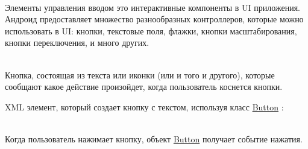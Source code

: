\newcommand{\View}{
  \href{https://developer.android.com/reference/android/view/View.html}{View}
}

\newcommand{\Button}{
  \href{https://developer.android.com/reference/android/widget/Button.html}{Button}
}

\newcommand{\Activity}{
  \href{https://developer.android.com/reference/android/app/Activity.html}{Activity}
}

\newcommand{\OnClickListener}{
  \href{https://developer.android.com/reference/android/view/View.OnClickListener.html}{View.OnClickListener}
}

\newcommand{\EditText}{
  \href{https://developer.android.com/reference/android/widget/EditText.html}{EditText}
}

\newcommand{\OnEditorActionListener}{
  \href{https://developer.android.com/reference/android/widget/TextView.OnEditorActionListener.html}{TextView.OnEditorActionListener}
}

\newcommand{\Checkbox}{
  \href{https://developer.android.com/reference/android/widget/CheckBox.html}{Checkbox}
}

\newcommand{\RadioButton}{
  \href{https://developer.android.com/reference/android/widget/RadioButton.html}{RadioButton}
}

\newcommand{\ToggleButton}{
  \href{https://developer.android.com/guide/topics/ui/controls/togglebutton.html}{ToggleButton}
}

\newcommand{\Spinner}{
  \href{https://developer.android.com/reference/android/widget/Spinner.html}{Spinner}
}


\\
Элементы управления вводом это интерактивные компоненты в UI приложения.
Андроид предоставляет множество разнообразных контроллеров, которые можно
использовать в UI: кнопки, текстовые поля, флажки, кнопки
масштабирования, кнопки переключения, и много других.

\\
Кнопка, состоящая из текста или иконки (или и того и другого), которые сообщают
какое действие произойдет, когда пользователь коснется кнопки.

XML элемент, который создает кнопку с текстом, используя класс \Button:

\\
Когда пользователь нажимает кнопку, объект \Button получает событие нажатия.

